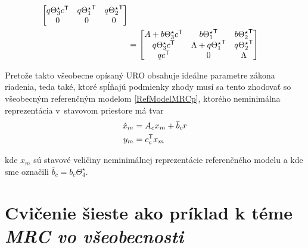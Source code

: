 \documentclass[a4paper, 10pt, ]{article}
\begin{document}
\begin{equation}
\begin{split}
\begin{bmatrix}
			q \Theta_3^\star c^{\mathsf{T}} & q {\Theta_1^\star}^{\mathsf{T}} & q {\Theta_2^\star}^{\mathsf{T}} \\
			0 & 0 & 0
		\end{bmatrix} \\
		&=
		\begin{bmatrix}
             A +  b \Theta_3^\star c^{\mathsf{T}}&
	    	 b {\Theta_1^\star}^{\mathsf{T}} &
	    	 b {\Theta_2^\star}^{\mathsf{T}} \\
	    	 q \Theta_3^\star c^{\mathsf{T}} &
	    	 \Lambda + q {\Theta_1^\star}^{\mathsf{T}} &
	    	 q {\Theta_2^\star}^{\mathsf{T}} \\
	    	 q c^{\mathsf{T}} & 0 & \Lambda
	 	\end{bmatrix}
	\end{split}
\end{equation}

Pretože takto všeobecne opísaný URO obsahuje ideálne parametre zákona riadenia, teda také, ktoré spĺňajú podmienky zhody musí sa tento zhodovať so všeobecným referenčným modelom \eqref{RefModelMRCp}, ktorého neminimálna reprezentácia v~stavovom priestore má tvar
\begin{subequations} \label{vsNeminimalRMMRCp}
	\begin{align}
		\dot x_m &= A_c x_m + \overline{b}_c r \\
		y_m &= c_c^{\mathsf{T}} x_m
	\end{align}
\end{subequations}














kde $x_m$ sú stavové veličiny neminimálnej reprezentácie referenčného modelu a kde sme označili $\overline{b}_c = b_c \Theta_4^\star$.





















\section{Cvičenie šieste ako príklad k téme \emph{MRC vo všeobecnosti}}
\label{pkTMRC}
\end{document}
